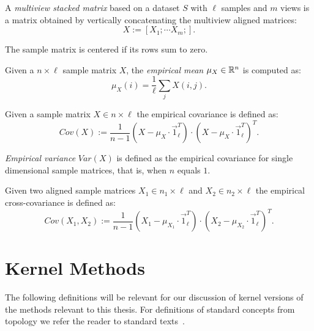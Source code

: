 \begin{definition}\label{def:notation:multiview_stacked_matrix}
A \emph{multiview stacked matrix} based on a dataset $S$ with $\ell$ samples and $m$ views is a matrix obtained by
vertically concatenating the multiview aligned matrices:
$$ X := \left[ X_1; \cdots X_m; \right].$$
\end{definition}

\begin{definition}\label{def:notation:centered_matrix}
The sample matrix is centered if its rows sum to zero.
\end{definition}

\begin{definition}\label{def:notation:empirical_mean}
Given a $n\times\ell$ sample matrix $X$, the \emph{empirical mean} $\mu_X \in \mathbb{R}^n$ is computed as:
$$ \mu_X(i) = \frac{1}{\ell} \sum_j X(i,j).$$
\end{definition}

\begin{definition}\label{def:notation:empirical_covariance}
Given a sample matrix $X \in n \times \ell$
 the empirical covariance is defined as:
$$ Cov(X) := \frac{1}{n-1}(X - \mu_{X} \cdot \vec{1}_\ell^T)\cdot(X - \mu_{X} \cdot \vec{1}_\ell^T)^T.$$
\end{definition}

\begin{definition}\label{def:notation:empirical_variance}
\emph{Empirical variance} $Var(X)$ is defined as the empirical covariance for single dimensional sample matrices, that is, when $n$ equals $1$.
\end{definition}

\begin{definition}\label{def:notation:empirical_cross_covariance}
Given two aligned sample matrices $X_1 \in n_1 \times \ell$ and $X_2 \in n_2 \times \ell$
 the empirical cross-covariance is defined as:
$$ Cov(X_1, X_2) := \frac{1}{n-1}(X_1 - \mu_{X_1} \cdot \vec{1}_\ell^T)\cdot(X_2 - \mu_{X_2} \cdot \vec{1}_\ell^T)^T.$$
\end{definition}


\section{Kernel Methods}
The following definitions will be relevant for our discussion of kernel versions of the methods relevant to this thesis. For definitions
of standard concepts from topology we refer the reader to standard texts~\cite{bourbaki1998general}.


